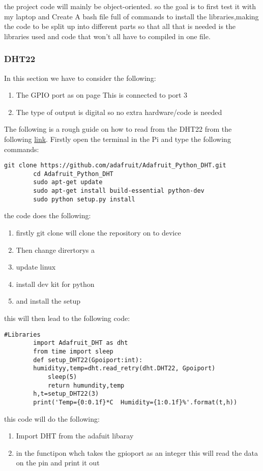 	the project code will mainly be object-oriented. so the goal is to first test it with my laptop and  Create A bash file  full of  commands to install  the libraries,making the code to be split up  into  different parts so that all that is needed is the libraries used and code that won't all have to  compiled in one file.

	\subsubsection{DHT22}
	In this section we have to consider the following: 
	\begin{enumerate}
		\item The GPIO port as on page \pageref{Sychematic for DHT22 revised} This is connected to port 3 
		\item The type of output is digital so no  extra hardware/code is needed
	\end{enumerate}

	The following is  a rough guide on how to read from the DHT22 from the following \href{https://www.instructables.com/Raspberry-Pi-Tutorial-How-to-Use-the-DHT-22/}{link}.
	Firstly open the terminal in the Pi and
	type the following commands:
	\begin{lstlisting}[style=bashstyle]
		git clone https://github.com/adafruit/Adafruit_Python_DHT.git
		cd Adafruit_Python_DHT
		sudo apt-get update
		sudo apt-get install build-essential python-dev
		sudo python setup.py install
	\end{lstlisting}
	the code does the following:
	\begin{enumerate}
		\item firstly git clone will clone the  repository on to device
		\item Then change dirertorys  a
		\item update linux
		\item install dev kit for  python 
		\item and install the setup 
	\end{enumerate}
	
	\newpage
	this will then lead to  the  following code:
	\begin{lstlisting}[style=mystyle,caption={Example code for DHT2}]
		#Libraries
		import Adafruit_DHT as dht
		from time import sleep
		def setup_DHT22(Gpoiport:int):
		humidityy,temp=dht.read_retry(dht.DHT22, Gpoiport)
			sleep(5)
			return humundity,temp
		h,t=setup_DHT22(3)
		print('Temp={0:0.1f}*C  Humidity={1:0.1f}%'.format(t,h))
	\end{lstlisting}
	this code will do the following:
	\begin{enumerate}
		\item Import DHT from the adafuit libaray
		\item in the  functipon whch takes the gpioport  as an integer this will read the data on the pin and  print it  out
	\end{enumerate}
	
